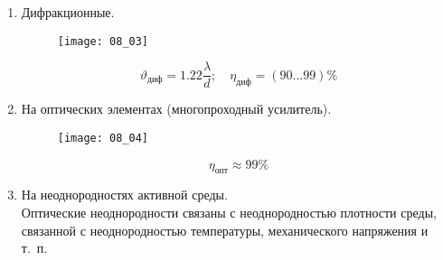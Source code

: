 \begin{enumerate}
  \item Дифракционные.
    \begin{figure}[h!]
      \center
      \texttt{[image: 08\_03]}
    \end{figure}
    \[
      \vartheta_\text{диф} = 1.22\frac{\lambda}{d}; \quad
        \eta_\text{диф} = (90\ldots99)\%
    \]
  \item На оптических элементах (многопроходный усилитель).
    \begin{figure}[h!]
      \center
      \texttt{[image: 08\_04]}
    \end{figure}
    \[
      \eta_\text{опт} \approx 99\%
    \]
  \item На неоднородностях активной среды. \\
    Оптические неоднородности связаны с неоднородностью плотности среды,
    связанной с неоднородностью температуры, механического напряжения и т.~п.
\end{enumerate}
